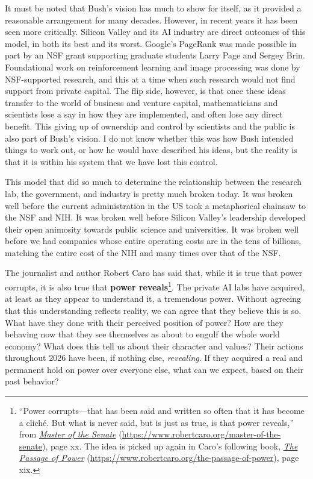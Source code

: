 \documentclass[11pt]{amsart}
\begin{document}
It must be noted that Bush's vision has much to show for itself, as it provided a reasonable arrangement for many decades. However, in recent years it has been seen more critically. Silicon Valley and its AI industry are direct outcomes of this model, in both its best and its worst. Google's PageRank was made possible in part by an NSF grant supporting graduate students Larry Page and Sergey Brin. Foundational work on reinforcement learning and image processing was done by NSF-supported research, and this at a time when such research would not find support from private capital. The flip side, however, is that once these ideas transfer to the world of business and venture capital, mathematicians and scientists lose a say in how they are implemented, and often lose any direct benefit. This giving up of ownership and control by scientists and the public is also part of Bush's vision. I do not know whether this was how Bush intended things to work out, or how he would have described his ideas, but the reality is that it is within his system that we have lost this control.

This model that did so much to determine the relationship between the research lab, the government, and industry is pretty much broken today. It was broken well before the current administration in the US took a metaphorical chainsaw to the NSF and NIH. It was broken well before Silicon Valley's leadership developed their open animosity towards public science and universities. It was broken well before we had companies whose entire operating costs are in the tens of billions, matching the entire cost of the NIH and many times over that of the NSF.

The journalist and author Robert Caro has said that, while it is true that power corrupts, it is also true that \textbf{power reveals}\footnote{``Power corrupts---that has been said and written so often that it has become a cliché. But what is never said, but is just as true, is that power reveals,'' from \href{https://www.robertcaro.org/master-of-the-senate}{\emph{Master of the Senate}} (\url{https://www.robertcaro.org/master-of-the-senate}), page xx. The idea is picked up again in Caro's following book, \href{https://www.robertcaro.org/the-passage-of-power}{\emph{The Passage of Power}} (\url{https://www.robertcaro.org/the-passage-of-power}), page xix.}. The private AI labs have acquired, at least as they appear to understand it, a tremendous power. Without agreeing that this understanding reflects reality, we can agree that they believe this is so. What have they done with their perceived position of power? How are they behaving now that they see themselves as about to engulf the whole world economy? What does this tell us about their character and values? Their actions throughout 2026 have been, if nothing else, \emph{revealing}. If they acquired a real and permanent hold on power over everyone else, what can we expect, based on their past behavior?
\end{document}
